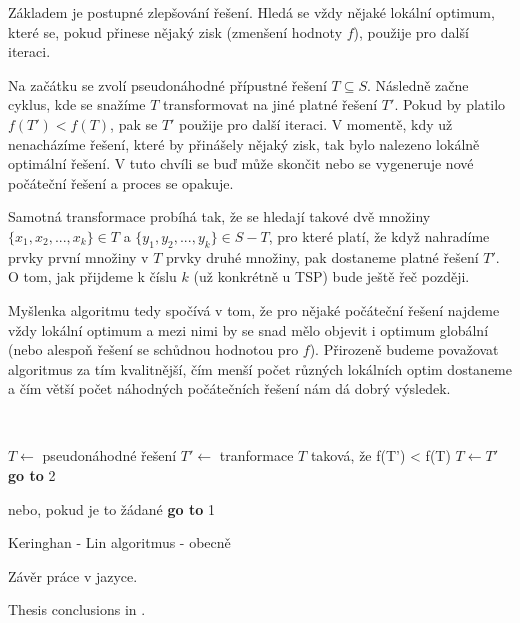 \documentclass[
  biblatex,
  figures=false,
  glossaries,
  index
]{kidiplom}
\begin{document}
Základem je postupné zlepšování řešení. Hledá se vždy nějaké lokální optimum, které se, pokud přinese nějaký zisk (zmenšení hodnoty $f$), použije pro další iteraci.

Na začátku se zvolí pseudonáhodné přípustné řešení $T \subseteq S$. Následně začne cyklus, kde se snažíme $T$ transformovat na jiné platné řešení $T'$. Pokud by platilo $f(T') < f(T)$, pak se $T'$ použije pro další iteraci. V momentě, kdy už nenacházíme řešení, které by přinášely nějaký zisk, tak bylo nalezeno lokálně optimální řešení. V tuto chvíli se buď může skončit nebo se vygeneruje nové počáteční řešení a proces se opakuje.

\sloppy Samotná transformace probíhá tak, že se hledají takové dvě množiny ${\{x_1, x_2, ..., x_k\} \in T}$ a $\{y_1, y_2, ..., y_k\} \in S - T$, pro které platí, že když nahradíme prvky první množiny v $T$ prvky druhé množiny, pak dostaneme platné řešení $T'$. O tom, jak přijdeme k číslu $k$ (už konkrétně u TSP) bude ještě řeč později.

Myšlenka algoritmu tedy spočívá v tom, že pro nějaké počáteční řešení najdeme vždy lokální optimum a mezi nimi by se snad mělo objevit i optimum globální (nebo alespoň řešení se schůdnou hodnotou pro $f$). Přirozeně budeme považovat algoritmus za tím kvalitnější, čím menší počet různých lokálních optim dostaneme a čím větší počet náhodných počátečních řešení nám dá dobrý výsledek.\newline


{\LinesNumbered\SetAlgoNoLine\
\begin{algorithm}[H]
$T \leftarrow$ pseudonáhodné řešení\;
$T' \leftarrow$ tranformace $T$ taková, že f(T') < f(T)\;
{$T \leftarrow T'$\;
\textbf{go to} 2\;}
\Else
{
\Return{} nebo, pokud je to žádané \textbf{go to} 1\;
\caption{Keringhan - Lin algoritmus - obecně}
}
\end{algorithm}}\leavevmode\newline





\begin{kiconclusions}
Závěr práce v  jazyce.
\end{kiconclusions}

\begin{kiconclusions}[english]
Thesis conclusions in .
\end{kiconclusions}


\end{document}
